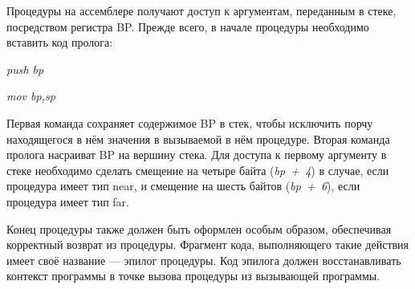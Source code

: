 Процедуры на ассемблере получают доступ к аргументам, переданным в стеке,
посредством регистра BP. Прежде всего, в начале процедуры необходимо вставить
код пролога:

\textit{push bp}

\textit{mov bp,sp}

Первая команда сохраняет содержимое BP в стек, чтобы исключить порчу находящегося
в нём значения в вызываемой в нём процедуре. Вторая команда пролога насраиват BP
на вершину стека. Для доступа к первому аргументу в стеке необходимо
сделать смещение на четыре байта (\textit{bp~+~4}) в случае, если процедура имеет тип near,
и смещение на шесть байтов (\textit{bp~+~6}), если процедура имеет тип far.

Конец процедуры также должен быть оформлен особым образом, обеспечивая корректный
возврат из процедуры. Фрагмент кода, выполняющего такие действия имеет своё
название --- эпилог процедуры. Код эпилога должен восстанавливать контекст программы
в точке вызова процедуры из вызывающей программы.

\pagebreak
